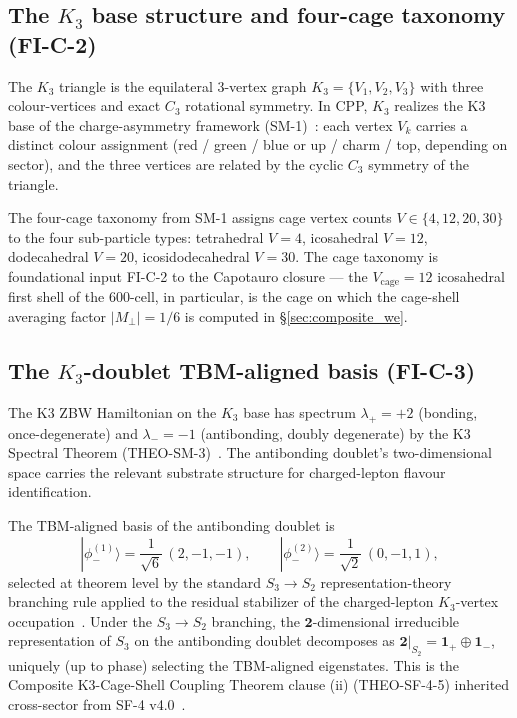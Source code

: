 \documentclass[11pt,letterpaper]{article}
\newcommand{\Kthree}{\ensuremath{K_3}}
\newcommand{\phiminusOne}{|\phi_-^{(1)}\rangle}
\newcommand{\phiminusTwo}{|\phi_-^{(2)}\rangle}
\newcommand{\Sthree}{S_3}
\begin{document}
\subsection{The $\Kthree$ base structure and four-cage taxonomy (FI-C-2)}\label{sec:k3_base}

The $\Kthree$ triangle is the equilateral 3-vertex graph $\Kthree = \{V_1, V_2, V_3\}$ with three colour-vertices and exact $C_3$ rotational symmetry. In CPP, $\Kthree$ realizes the K3 base of the charge-asymmetry framework (SM-1)~\cite{abshier_sm1}: each vertex $V_k$ carries a distinct colour assignment (red / green / blue or up / charm / top, depending on sector), and the three vertices are related by the cyclic $C_3$ symmetry of the triangle.

The four-cage taxonomy from SM-1 assigns cage vertex counts $V \in \{4, 12, 20, 30\}$ to the four sub-particle types: tetrahedral $V=4$, icosahedral $V=12$, dodecahedral $V=20$, icosidodecahedral $V=30$. The cage taxonomy is foundational input FI-C-2 to the Capotauro closure --- the $V_\text{cage} = 12$ icosahedral first shell of the 600-cell, in particular, is the cage on which the cage-shell averaging factor $|M_\perp| = 1/6$ is computed in \S\ref{sec:composite_we}.

\subsection{The $\Kthree$-doublet TBM-aligned basis (FI-C-3)}\label{sec:k3_tbm_basis}

The K3 ZBW Hamiltonian on the $\Kthree$ base has spectrum $\lambda_+ = +2$ (bonding, once-degenerate) and $\lambda_- = -1$ (antibonding, doubly degenerate) by the K3 Spectral Theorem (THEO-SM-3)~\cite{abshier_sm3}. The antibonding doublet's two-dimensional space carries the relevant substrate structure for charged-lepton flavour identification.

The TBM-aligned basis of the antibonding doublet is
\[
\phiminusOne = \frac{1}{\sqrt{6}}\,(2, -1, -1), \qquad
\phiminusTwo = \frac{1}{\sqrt{2}}\,(0, -1, 1),
\]
selected at theorem level by the standard $\Sthree \to S_2$ representation-theory branching rule applied to the residual stabilizer of the charged-lepton $\Kthree$-vertex occupation~\cite{abshier_sf4}. Under the $\Sthree \to S_2$ branching, the $\mathbf{2}$-dimensional irreducible representation of $\Sthree$ on the antibonding doublet decomposes as $\mathbf{2}|_{S_2} = \mathbf{1}_+ \oplus \mathbf{1}_-$, uniquely (up to phase) selecting the TBM-aligned eigenstates. This is the Composite K3-Cage-Shell Coupling Theorem clause (ii) (THEO-SF-4-5) inherited cross-sector from SF-4 v4.0~\cite{abshier_sf4}.
\end{document}
